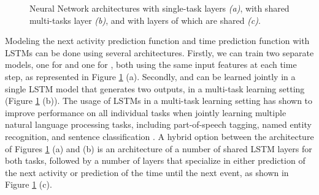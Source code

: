 \documentclass[runningheads,a4paper]{llncs}
\begin{document}
\begin{figure}[t]
{
	}
	\caption{Neural Network architectures with single-task layers \emph{(a)}, with shared multi-tasks layer \emph{(b)}, and with  layers of which  are shared \emph{(c)}.}
	\label{fig:rnn_architectures}
	\vspace{-0.3cm}
\end{figure}

Modeling the next activity prediction function  and time prediction function  with LSTMs can be done using several architectures. Firstly, we can train two separate models, one for  and one for , both using the same input features at each time step, as represented in Figure \ref{fig:rnn_architectures} (a). Secondly,  and  can be learned jointly in a single LSTM model that generates two outputs, in a multi-task learning setting \cite{Caruana1997} (Figure \ref{fig:rnn_architectures} (b)). The usage of LSTMs in a multi-task learning setting has shown to improve performance on all individual tasks when jointly learning multiple natural language processing tasks, including part-of-speech tagging, named entity recognition, and sentence classification \cite{Collobert2008}. A hybrid option between the architecture of Figures \ref{fig:rnn_architectures} (a) and (b) is an architecture of a number of shared LSTM layers for both tasks, followed by a number of layers that specialize in either prediction of the next activity or prediction of the time until the next event, as shown in Figure \ref{fig:rnn_architectures} (c).
\end{document}
